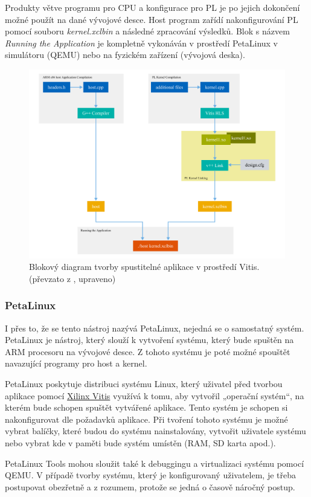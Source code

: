 \documentclass[a4paper, twoside, 11pt]{article}
\begin{document}
		Produkty větve programu pro CPU a konfigurace pro PL je po jejich dokončení možné použít na dané vývojové desce. Host program zařídí nakonfigurování PL pomocí souboru \textit{kernel.xclbin} a následné zpracování výsledků. Blok s názvem \textit{Running the Application} je kompletně vykonáván v prostředí PetaLinux v simulátoru (QEMU) nebo na fyzickém zařízení (vývojová deska).
		\begin{figure}[htbp!]
			\centering
			\includegraphics[width=1\textwidth]{src/png/vitis-development-flow.png}
			\caption{Blokový diagram tvorby spustitelné aplikace v prostředí Vitis. (převzato z \cite{vitis-unified-software-platform-documentation-2022}, upraveno)}
			\label{fig:vitis-development-flow}
		\end{figure}
		
		\subsubsection{PetaLinux}\label{subsubsec:petalinux}
			I přes to, že se tento nástroj nazývá PetaLinux, nejedná se o samostatný systém. PetaLinux je nástroj, který slouží k vytvoření systému, který bude spuštěn na ARM procesoru na vývojové desce. Z tohoto systému je poté možné spouštět navazující programy pro host a kernel.\par
			PetaLinux poskytuje distribuci systému Linux, který uživatel před tvorbou aplikace pomocí \hyperref[subsubsec:xilinx-vitis]{Xilinx Vitis} využívá k tomu, aby vytvořil „operační systém“, na kterém bude schopen spuštět vytvářené aplikace. Tento systém je schopen si nakonfigurovat dle požadavků aplikace. Při tvoření tohoto systému je možné vybrat balíčky, které budou do systému nainstalovány, vytvořit uživatele systému nebo vybrat kde v paměti bude systém umístěn (RAM, SD karta apod.). \cite{xilinx-petalinux}\par
			PetaLinux Tools mohou sloužit také k debuggingu a virtualizaci systému pomocí QEMU. V případě tvorby systému, který je konfigurovaný uživatelem, je třeba postupovat obezřetně a z rozumem, protože se jedná o časově náročný postup.
\end{document}
